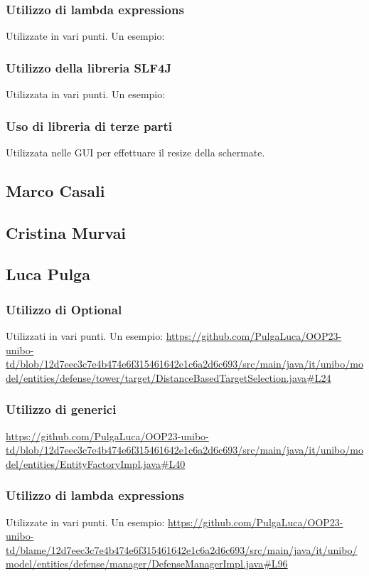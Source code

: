 \documentclass[a4paper,12pt]{report}
\begin{document}
\subsubsection{Utilizzo di lambda expressions}
Utilizzate in vari punti. Un esempio:
\url{}

\subsubsection{Utilizzo della libreria SLF4J}
Utilizzata in vari punti. Un esempio:  
\url{}

\subsubsection{Uso di libreria di terze parti}
Utilizzata nelle GUI per effettuare il resize della schermate.
\url{}
\subsection{Marco Casali}
\subsection{Cristina Murvai}
\subsection{Luca Pulga}
\subsubsection{Utilizzo di Optional}
Utilizzati in vari punti. Un esempio: 
\url{https://github.com/PulgaLuca/OOP23-unibo-td/blob/12d7eec3c7e4b474e6f315461642e1c6a2d6c693/src/main/java/it/unibo/model/entities/defense/tower/target/DistanceBasedTargetSelection.java#L24}

\subsubsection{Utilizzo di generici}
\url{https://github.com/PulgaLuca/OOP23-unibo-td/blob/12d7eec3c7e4b474e6f315461642e1c6a2d6c693/src/main/java/it/unibo/model/entities/EntityFactoryImpl.java#L40}

\subsubsection{Utilizzo di lambda expressions}
Utilizzate in vari punti. Un esempio:  
\url{https://github.com/PulgaLuca/OOP23-unibo-td/blame/12d7eec3c7e4b474e6f315461642e1c6a2d6c693/src/main/java/it/unibo/model/entities/defense/manager/DefenseManagerImpl.java#L96}
\end{document}
